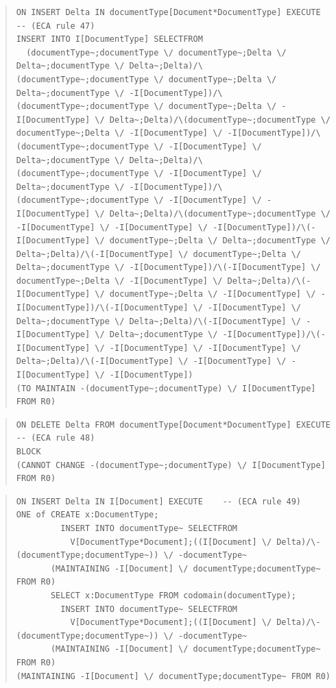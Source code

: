 \documentclass[10pt,a4paper]{report}              %
\theoremstyle{plain}\theorembodyfont{\rmfamily}\newtheorem{definition}{Definition}[section]
\theoremstyle{plain}\theorembodyfont{\rmfamily}\newtheorem{designrule}[definition]{Requirement}
\begin{document}
\begin{quote}
\begin{verbatim}
ON INSERT Delta IN documentType[Document*DocumentType] EXECUTE    -- (ECA rule 47)
INSERT INTO I[DocumentType] SELECTFROM
  (documentType~;documentType \/ documentType~;Delta \/ Delta~;documentType \/ Delta~;Delta)/\(documentType~;documentType \/ documentType~;Delta \/ Delta~;documentType \/ -I[DocumentType])/\(documentType~;documentType \/ documentType~;Delta \/ -I[DocumentType] \/ Delta~;Delta)/\(documentType~;documentType \/ documentType~;Delta \/ -I[DocumentType] \/ -I[DocumentType])/\(documentType~;documentType \/ -I[DocumentType] \/ Delta~;documentType \/ Delta~;Delta)/\(documentType~;documentType \/ -I[DocumentType] \/ Delta~;documentType \/ -I[DocumentType])/\(documentType~;documentType \/ -I[DocumentType] \/ -I[DocumentType] \/ Delta~;Delta)/\(documentType~;documentType \/ -I[DocumentType] \/ -I[DocumentType] \/ -I[DocumentType])/\(-I[DocumentType] \/ documentType~;Delta \/ Delta~;documentType \/ Delta~;Delta)/\(-I[DocumentType] \/ documentType~;Delta \/ Delta~;documentType \/ -I[DocumentType])/\(-I[DocumentType] \/ documentType~;Delta \/ -I[DocumentType] \/ Delta~;Delta)/\(-I[DocumentType] \/ documentType~;Delta \/ -I[DocumentType] \/ -I[DocumentType])/\(-I[DocumentType] \/ -I[DocumentType] \/ Delta~;documentType \/ Delta~;Delta)/\(-I[DocumentType] \/ -I[DocumentType] \/ Delta~;documentType \/ -I[DocumentType])/\(-I[DocumentType] \/ -I[DocumentType] \/ -I[DocumentType] \/ Delta~;Delta)/\(-I[DocumentType] \/ -I[DocumentType] \/ -I[DocumentType] \/ -I[DocumentType])
(TO MAINTAIN -(documentType~;documentType) \/ I[DocumentType] FROM R0)
\end{verbatim}
\end{quote}
\begin{quote}
\begin{verbatim}
ON DELETE Delta FROM documentType[Document*DocumentType] EXECUTE    -- (ECA rule 48)
BLOCK
(CANNOT CHANGE -(documentType~;documentType) \/ I[DocumentType] FROM R0)
\end{verbatim}
\end{quote}
\begin{quote}
\begin{verbatim}
ON INSERT Delta IN I[Document] EXECUTE    -- (ECA rule 49)
ONE of CREATE x:DocumentType;
         INSERT INTO documentType~ SELECTFROM
           V[DocumentType*Document];((I[Document] \/ Delta)/\-(documentType;documentType~)) \/ -documentType~
       (MAINTAINING -I[Document] \/ documentType;documentType~ FROM R0)
       SELECT x:DocumentType FROM codomain(documentType);
         INSERT INTO documentType~ SELECTFROM
           V[DocumentType*Document];((I[Document] \/ Delta)/\-(documentType;documentType~)) \/ -documentType~
       (MAINTAINING -I[Document] \/ documentType;documentType~ FROM R0)
(MAINTAINING -I[Document] \/ documentType;documentType~ FROM R0)
\end{verbatim}
\end{quote}
\end{document}
